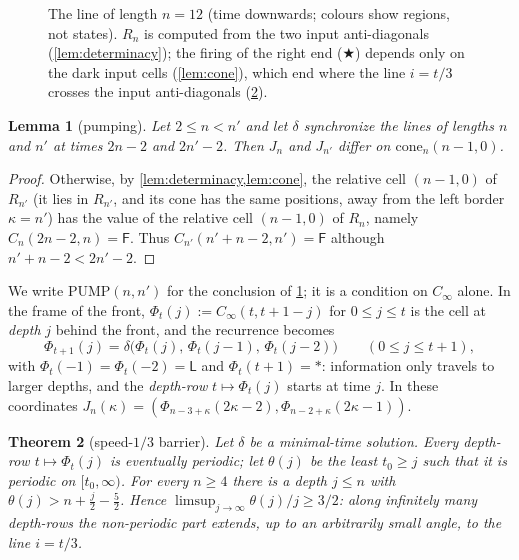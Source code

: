\documentclass[3p]{elsarticle}
\newtheorem{theorem}{Theorem}[section]
\newtheorem{lemma}[theorem]{Lemma}
\theoremstyle{remark}
\begin{document}
\begin{figure}[t]
\centering
\scalebox{0.9}{}
\caption{The line of length $n=12$ (time downwards; colours show regions, not
states). $R_n$ is computed from the two input anti-diagonals
(\cref{lem:determinacy}); the firing of the right end ($\bigstar$) depends only
on the dark input cells (\cref{lem:cone}), which end where the line $i=t/3$
crosses the input anti-diagonals (\cref{thm:third}).}
\label{fig:anatomy}
\end{figure}

\begin{lemma}[pumping]\label{lem:pumping}
Let $2\le n<n'$ and let $\delta$ synchronize the lines of lengths $n$ and $n'$
at times $2n-2$ and $2n'-2$. Then $J_n$ and $J_{n'}$ differ on
$\mathrm{cone}_n(n-1,0)$.
\end{lemma}

\begin{proof}
Otherwise, by \cref{lem:determinacy,lem:cone}, the relative cell $(n-1,0)$ of
$R_{n'}$ (it lies in $R_{n'}$, and its cone has the same positions, away from
the left border $\kappa=n'$) has the value of the relative cell $(n-1,0)$ of
$R_n$, namely $C_n(2n-2,n)=\mathsf F$. Thus $C_{n'}(n'+n-2,n')=\mathsf F$
although $n'+n-2<2n'-2$.
\end{proof}

We write $\mathrm{PUMP}(n,n')$ for the conclusion of \cref{lem:pumping}; it is
a condition on $C_\infty$ alone. In the frame of the front,
$\Phi_t(j):=C_\infty(t,t+1-j)$ for $0\le j\le t$ is the cell at \emph{depth} $j$
behind the front, and the recurrence becomes
\begin{equation}\label{eq:comoving}
\Phi_{t+1}(j)=\delta\bigl(\Phi_t(j),\,\Phi_t(j-1),\,\Phi_t(j-2)\bigr)
\qquad(0\le j\le t+1),
\end{equation}
with $\Phi_t(-1)=\Phi_t(-2)=\mathsf L$ and $\Phi_t(t+1)=\ast$: information only
travels to larger depths, and the \emph{depth-row} $t\mapsto\Phi_t(j)$ starts
at time $j$. In these coordinates
$J_n(\kappa)=(\Phi_{n-3+\kappa}(2\kappa-2),\Phi_{n-2+\kappa}(2\kappa-1))$.

\begin{theorem}[speed-$1/3$ barrier]\label{thm:third}
Let $\delta$ be a minimal-time solution. Every depth-row $t\mapsto\Phi_t(j)$ is
eventually periodic; let $\theta(j)$ be the least $t_0\ge j$ such that it is
periodic on $[t_0,\infty)$. For every $n\ge4$ there is a depth $j\le n$ with
$\theta(j)>n+\tfrac{j}{2}-\tfrac52$. Hence
$\limsup_{j\to\infty}\theta(j)/j\ge 3/2$: along infinitely many depth-rows the
non-periodic part extends, up to an arbitrarily small angle, to the line
$i=t/3$.
\end{theorem}
\end{document}

